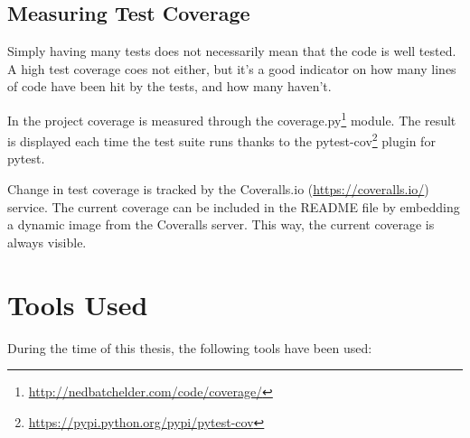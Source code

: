 \subsection{Measuring Test Coverage}

Simply having many tests does not necessarily mean that the code is well tested.
A high test coverage coes not either, but it's a good indicator on how many
lines of code have been hit by the tests, and how many haven't.

In the \tangible{} project coverage is measured through the
coverage.py\footnote{\url{http://nedbatchelder.com/code/coverage/}} module. The
result is displayed each time the test suite runs thanks to the
pytest-cov\footnote{\url{https://pypi.python.org/pypi/pytest-cov}} plugin for
pytest.

Change in test coverage is tracked by the Coveralls.io
(\url{https://coveralls.io/}) service. The current coverage can be included in
the README file by embedding a dynamic image from the Coveralls server. This
way, the current coverage is always visible.


\section{Tools Used}

During the time of this thesis, the following tools have been used:

